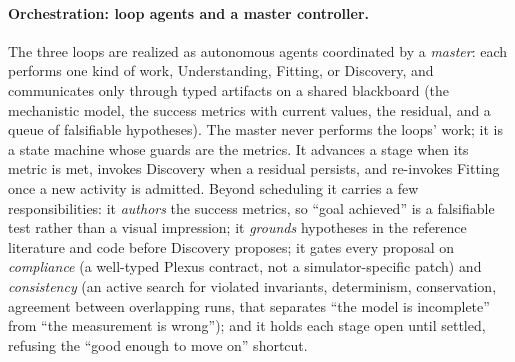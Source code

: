 \documentclass[11pt]{article}
\begin{document}
\paragraph{Orchestration: loop agents and a master controller.}
The three loops are realized as autonomous agents coordinated by a \emph{master}: each
performs one kind of work, Understanding, Fitting, or Discovery, and communicates only
through typed artifacts on a shared blackboard (the mechanistic model, the success metrics
with current values, the residual, and a queue of falsifiable hypotheses). The master never
performs the loops' work; it is a state machine whose guards are the metrics. It advances a
stage when its metric is met, invokes Discovery when a residual persists, and re-invokes Fitting
once a new activity is admitted. Beyond scheduling it carries a few responsibilities: it
\emph{authors} the success metrics, so ``goal achieved'' is a falsifiable test rather than a
visual impression; it \emph{grounds} hypotheses in the reference literature and code before
Discovery proposes; it gates every proposal on \emph{compliance} (a well-typed Plexus
contract, not a simulator-specific patch) and \emph{consistency} (an active search for
violated invariants, determinism, conservation, agreement between overlapping runs,
that separates ``the model is incomplete'' from ``the measurement is wrong''); and it holds
each stage open until settled, refusing the ``good enough to move on'' shortcut.
\end{document}
